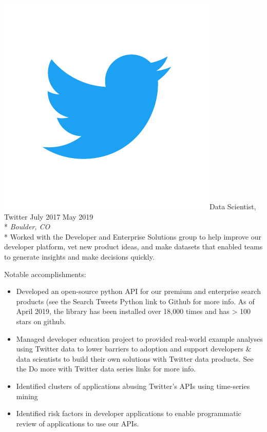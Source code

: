 \documentclass[print]{friggeri-cv} %
\newcommand{\twittericon}{\includegraphics[scale=0.05]{Twitter_Logo_Blue.png}}%
\begin{document}
\begin{description} \itemsep1pt \parskip0pt 
  \item \twittericon {\largeheaderfont Data Scientist, Twitter } \hfill
    {\smallheaderfont July 2017 \textemdash  May 2019}\\*
    {\footnotesize \emph{Boulder, CO}} \\*
    Worked with the Developer and Enterprise Solutions group to help improve our
    developer platform, vet new product ideas, and make datasets that enabled
    teams to generate insights and make decisions quickly.

    {\smallheaderfont Notable accomplishments}:
    \begin{itemize} \itemsep1pt \parskip1pt 
      \item Developed an open-source python API for our premium and enterprise search
          products (see the Search Tweets Python link to Github for more info. As of
          April 2019, the library has been installed over 18,000 times and has > 100
          stars on github.
      \item Managed developer education project to provided real-world example analyses
        using Twitter data to lower barriers to adoption and support developers \& data
        scientists to build their own solutions with Twitter data products. See the Do
        more with Twitter data series links for more info.
      \item Identified clusters of applications abusing Twitter's APIs using time-series mining
      \item Identified risk factors in developer applications to enable programmatic
            review of applications to use our APIs.
    \end{itemize}
  \end{description}
\end{document}
